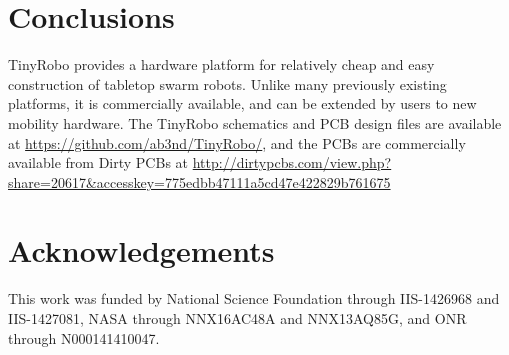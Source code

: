 \documentclass[letterpaper, 10 pt, conference]{ieeeconf}  %
\begin{document}
\section{Conclusions}

TinyRobo provides a hardware platform for relatively cheap and easy construction of tabletop swarm robots.
Unlike many previously existing platforms, it is commercially available, and can be extended by users to new mobility hardware. 
The TinyRobo schematics and PCB design files are available at \url{https://github.com/ab3nd/TinyRobo/}, and the PCBs are commercially available from Dirty PCBs at  \url{http://dirtypcbs.com/view.php?share=20617&accesskey=775edbb47111a5cd47e422829b761675}

\section{Acknowledgements}

This work was funded by National Science Foundation through IIS-1426968 and IIS-1427081, NASA through NNX16AC48A and NNX13AQ85G, and ONR through N000141410047.



\end{document}
